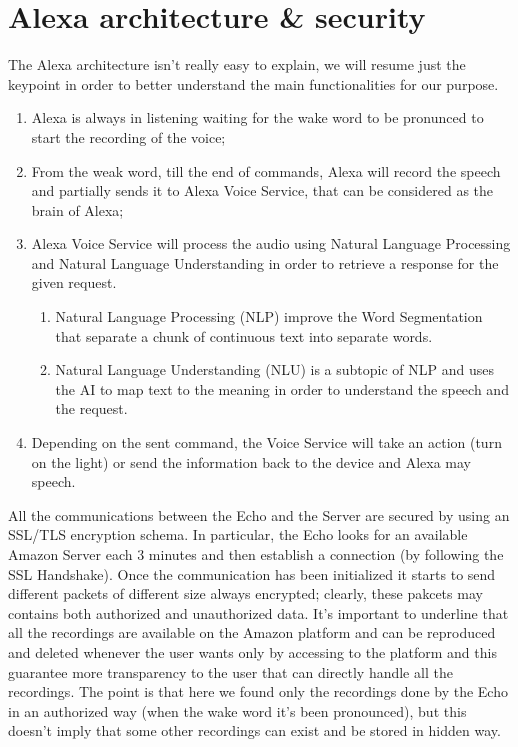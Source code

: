 \documentclass[sigconf]{acmart}
\begin{document}
    \section{Alexa architecture \& security}
    The Alexa architecture isn't really easy to explain, we will resume just the keypoint in order to better understand the main functionalities for our purpose.
    \begin{enumerate}
        \item Alexa is always in listening waiting for the wake word to be pronunced to start the recording of the voice;
        \item From the weak word, till the end of commands, Alexa will record the speech and partially sends it to Alexa Voice Service, that can be considered as the brain of Alexa;
        \item Alexa Voice Service will process the audio using Natural Language Processing and Natural Language Understanding in order to retrieve a response for the given request.
        \begin{enumerate}
            \item Natural Language Processing (NLP) improve the Word Segmentation that separate a chunk of continuous text into separate words.
            \item Natural Language Understanding (NLU) is a subtopic of NLP and uses the AI to map text to the meaning\cite{NLU} in order to understand the speech and the request.
        \end{enumerate}
        \item Depending on the sent command, the Voice Service will take an action (turn on the light) or send the information back to the device and Alexa may speech.
    \end{enumerate}
    All the communications between the Echo and the Server are secured by using an SSL/TLS encryption schema.
    In particular, the Echo looks for an available Amazon Server each 3 minutes and then establish a connection (by following the SSL Handshake).
    Once the communication has been initialized it starts to send different packets of different size always encrypted; clearly, these pakcets may contains both authorized and unauthorized data.
    It's important to underline that all the recordings are available on the Amazon platform and can be reproduced and deleted whenever the user wants only by accessing to the platform and this guarantee more transparency to the user that can directly handle all the recordings.
    The point is that here we found only the recordings done by the Echo in an authorized way (when the wake word it's been pronounced), but this doesn't imply that some other recordings can exist and be stored in hidden way.
\end{document}
